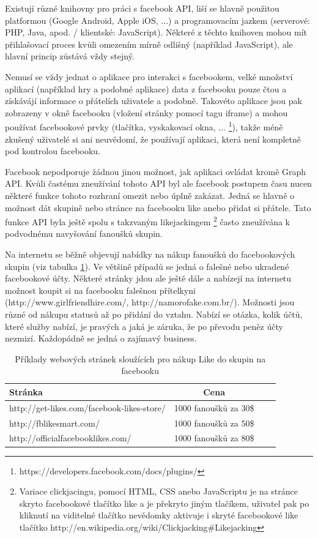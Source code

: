 \documentclass[thesis=M,czech]{FITthesis}[2013/05/10]
\begin{document}
Existují různé knihovny pro práci s facebook API, 
liší se hlavně použitou platformou (Google Android, Apple iOS, ...) 
a programovacím jazkem (serverové: PHP, Java, apod. / klientské:
JavaScript). Některé z těchto knihoven mohou mít přihlašovací proces
kvůli omezením mírně odlišný (například JavaScript), 
ale hlavní princip zůstává vždy stejný.

Nemusí se vždy jednat o aplikace pro interakci s facebookem, 
velké množství aplikací (například hry a podobné aplikace) 
data z facebooku pouze čtou a získávájí informace o přátelích
uživatele a podobně. Takovéto aplikace jsou pak zobrazeny v okně 
facebooku (vložení stránky pomocí tagu iframe) a mohou používat 
facebookové prvky (tlačítka, vyskakovací okna, ...
\footnote{https://developers.facebook.com/docs/plugins/}), 
takže méně zkušený uživatelé si ani neuvědomí, 
že používají aplikaci, která není kompletně pod kontrolou facebooku. 

Facebook nepodporuje žádnou jinou možnost, jak aplikaci ovládat 
kromě Graph API. Kvůli častému zneužívání tohoto API byl ale 
facebook postupem času nucen některé funkce tohoto rozhraní omezit 
nebo úplně zakázat. Jedná se hlavně o možnost dát skupině nebo 
stránce na facebooku like anebo přidat si přátele. 
Tato funkce API byla ještě spolu s takzvaným likejackingem 
\footnote{Variace clickjacingu, pomocí HTML, CSS anebo JavaScriptu je 
na stránce skryto facebookové tlačítko like a je překryto jiným 
tlačíkem, uživatel pak po kliknutí na viditelné tlačítko nevědomky 
aktivuje i skryté facebookové like tlačítko 
http://en.wikipedia.org/wiki/Clickjacking\#Likejacking} 
často zneužívána k podvodnému navyšování fanoušků skupin. 

Na internetu se běžně objevují nabídky na nákup fanoušků do 
facebookových skupin (viz tabulka \ref{tab:likes-buy}).
Ve většině případů se jedná o falešné nebo ukradené facebookové
účty.
Některé stránky jdou ale ještě dále a nabízejí na internetu možnost 
koupit si na facebooku falešnou přítelkyni 
(http://www.girlfriendhire.com/, http://namorofake.com.br/).
Možnosti jsou různé od nákupu statusů až po přidání do vztahu.
Nabízí se otázka, kolik účtů, které služby nabízí, je pravých a 
jaká je záruka, že po převodu peněz účty nezmizí. 
Každopádně se jedná o zajímavý business.


\begin{table}[h]
\centering
\caption{Příklady webových stránek sloužících pro nákup Like do skupin na facebooku}\label{tab:likes-buy}
\begin{tabular}{| l | c | p{5cm} | c |}
	\hline
	\textbf{Stránka} & 
	\textbf{Cena} \\ \hline
	
	http://get-likes.com/facebook-likes-store/ &
	1000 fanoušků za 30\$ \\ \hline
	
	http://fblikesmart.com/ &
	1000 fanoušků za 50\$ \\ \hline
	
	http://officialfacebooklikes.com/ &
	1000 fanoušků za 80\$ \\ \hline
\end{tabular}
\end{table}
\end{document}
